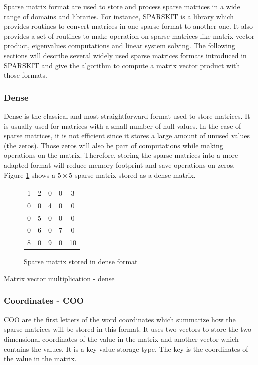 Sparse matrix format are used to store and process sparse matrices in a wide range of domains and libraries.
For instance, SPARSKIT \cite{Saad1990} is a library which provides routines to convert matrices in one sparse format to another one.
It also provides a set of routines to make operation on sparse matrices like matrix vector product, eigenvalues computations and linear system solving.
The following sections will describe several widely used sparse matrices formats introduced in SPARSKIT and give the algorithm to compute a matrix vector product with those formats.

\subsubsection{Dense}
Dense is the classical and most straightforward format used to store matrices.
It is usually used for matrices with a small number of null values.
In the case of sparse matrices, it is not efficient since it stores a large amount of unused values (the zeros).
Those zeros will also be part of computations while making operations on the matrix.
Therefore, storing the sparse matrices into a more adapted format will reduce memory footprint and save operations on zeros.
Figure \ref{fig:methods:dense_ex} shows a $5 \times 5$ sparse matrix stored as a dense matrix.

\begin{figure}[h]
\centering
\begin{tabular}{|ccccc|}
\hline
1 & 2 & 0 & 0 & 3 \\
0 & 0 & 4 & 0 & 0 \\
0 & 5 & 0 & 0 & 0 \\
0 & 6 & 0 & 7 & 0 \\
8 & 0 & 9 & 0 & 10 \\
\hline
\end{tabular}
\caption{Sparse matrix stored in dense format \label{fig:methods:dense_ex}}
\end{figure}

\begin{algorithm}[h]
	\DontPrintSemicolon
	\caption{Matrix vector multiplication - dense\label{fig:methods:dense_algo}}
\end{algorithm}

\subsubsection{Coordinates - COO}
COO are the first letters of the word coordinates which summarize how the sparse matrices will be stored in this format.
It uses two vectors to store the two dimensional coordinates of the value in the matrix and another vector which contains the values.
It is a key-value storage type.
The key is the coordinates of the value in the matrix.

